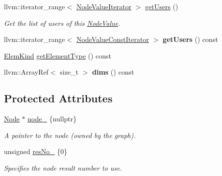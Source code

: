 \begin{DoxyCompactItemize}
llvm\+::iterator\+\_\+range$<$ \hyperlink{classglow_1_1_node_value_iterator_impl}{Node\+Value\+Iterator} $>$ \hyperlink{structglow_1_1_node_value_abfc5db28fbf6283170eb089ee5a54341}{get\+Users} ()
\begin{DoxyCompactList}\small\item\em Get the list of users of this \hyperlink{structglow_1_1_node_value}{Node\+Value}. \end{DoxyCompactList}\item 
\mbox{\label{structglow_1_1_node_value_a952af3279023e7ed63db98db588fa855}} 
llvm\+::iterator\+\_\+range$<$ \hyperlink{classglow_1_1_node_value_iterator_impl}{Node\+Value\+Const\+Iterator} $>$ {\bfseries get\+Users} () const
\end{DoxyCompactItemize}
\textbf{ }\par
\begin{DoxyCompactItemize}
\item 
\hyperlink{namespaceglow_ab92e14a94329daf4083db670e95fbcdf}{Elem\+Kind} \hyperlink{structglow_1_1_node_value_a44dc07623558f626625ef99f06b98668}{get\+Element\+Type} () const
\item 
\mbox{\label{structglow_1_1_node_value_aecc88cfe8334d77fe5bfbaa892bd3ac7}} 
llvm\+::\+Array\+Ref$<$ size\+\_\+t $>$ {\bfseries dims} () const
\end{DoxyCompactItemize}

\subsection*{Protected Attributes}
\begin{DoxyCompactItemize}
\item 
\mbox{\label{structglow_1_1_node_value_a550b1d5a8f680719955e29eab1bd867f}} 
\hyperlink{classglow_1_1_node}{Node} $\ast$ \hyperlink{structglow_1_1_node_value_a550b1d5a8f680719955e29eab1bd867f}{node\+\_\+} \{nullptr\}
\begin{DoxyCompactList}\small\item\em A pointer to the node (owned by the graph). \end{DoxyCompactList}\item 
\mbox{\label{structglow_1_1_node_value_a7db7ad30de53cb23f229c2f88b54e083}} 
unsigned \hyperlink{structglow_1_1_node_value_a7db7ad30de53cb23f229c2f88b54e083}{res\+No\+\_\+} \{0\}
\begin{DoxyCompactList}\small\item\em Specifies the node result number to use. \end{DoxyCompactList}\end{DoxyCompactItemize}


